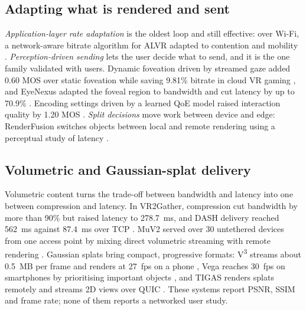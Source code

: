 \subsection{Adapting what is rendered and sent}
\emph{Application-layer rate adaptation} is the oldest loop and still effective: over Wi-Fi, a
network-aware bitrate algorithm for ALVR adapted to contention and mobility \cite{W4405014964}.
\emph{Perception-driven sending} lets the user decide what to send, and it is the one family validated
with users. Dynamic foveation driven by streamed gaze added 0.60 MOS over static foveation while saving
9.81\% bitrate in cloud VR gaming \cite{W4377981508}, and EyeNexus adapted the foveal region to bandwidth
and cut latency by up to 70.9\% \cite{W4416659623}. Encoding settings driven by a learned QoE model raised
interaction quality by 1.20 MOS \cite{W4400981668}. \emph{Split decisions} move work between device and
edge: RenderFusion switches objects between local and remote rendering using a perceptual study of
latency \cite{W4389296467}.

\subsection{Volumetric and Gaussian-splat delivery}
Volumetric content turns the trade-off between bandwidth and latency into one between compression and
latency. In VR2Gather, compression cut bandwidth by more than 90\% but raised latency to 278.7~ms, and
DASH delivery reached 562~ms against 87.4~ms over TCP \cite{W4362496249}. MuV2 served over 30 untethered devices from
one access point by mixing direct volumetric streaming with remote rendering \cite{W4399121637}. Gaussian
splats bring compact, progressive formats: V\textsuperscript{3} streams about 0.5~MB per frame and renders
at 27~fps on a phone \cite{W4404525293}, Vega reaches 30~fps on smartphones by prioritising important
objects \cite{W4416477288}, and TIGAS renders splats remotely and streams 2D views over QUIC
\cite{W7160906632}. These systems report PSNR, SSIM and frame rate; none of them reports a networked user
study.
